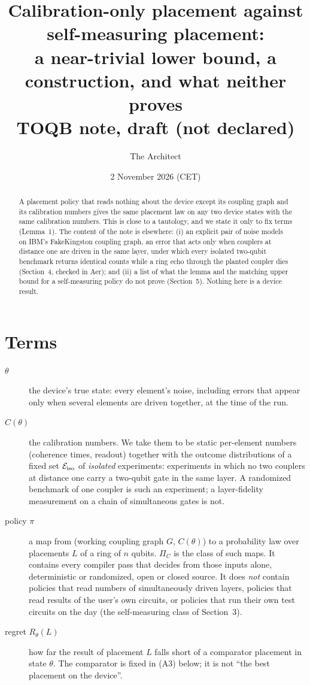 \documentclass[10pt,a4paper]{article}
\title{Calibration-only placement against self-measuring placement:\\ a near-trivial lower bound, a construction,
and what neither proves\\ \large TOQB note, draft (not declared)}
\author{The Architect}
\date{2 November 2026 (CET)}
\theoremstyle{definition}
\theoremstyle{remark}
\begin{document}
\maketitle

\begin{abstract}
A placement policy that reads nothing about the device except its coupling graph and its calibration numbers gives
the same placement law on any two device states with the same calibration numbers. This is close to a tautology, and
we state it only to fix terms (Lemma~1). The content of the note is elsewhere: (i) an explicit pair of noise models
on IBM's FakeKingston coupling graph, an error that acts only when couplers at distance one are driven in the same
layer, under which every isolated two-qubit benchmark returns identical counts while a ring echo through the planted
coupler dies (Section~4, checked in Aer); and (ii) a list of what the lemma and the matching upper bound for a
self-measuring policy do not prove (Section~5). Nothing here is a device result.
\end{abstract}

\section{Terms}

\begin{description}
\item[$\theta$] the device's true state: every element's noise, including errors that appear only when several
  elements are driven together, at the time of the run.
\item[$C(\theta)$] the calibration numbers. We take them to be static per-element numbers (coherence times, readout)
  together with the outcome distributions of a fixed set $\mathcal E_{\rm iso}$ of \emph{isolated} experiments:
  experiments in which no two couplers at distance one carry a two-qubit gate in the same layer. A randomized
  benchmark of one coupler is such an experiment; a layer-fidelity measurement on a chain of simultaneous gates is
  not.
\item[policy $\pi$] a map from (working coupling graph $G$, $C(\theta)$) to a probability law over placements $L$ of a
  ring of $n$ qubits. $\Pi_C$ is the class of such maps. It contains every compiler pass that decides from those inputs
  alone, deterministic or randomized, open or closed source. It does \emph{not} contain policies that read numbers of
  simultaneously driven layers, policies that read results of the user's own circuits, or policies that run their own
  test circuits on the day (the self-measuring class of Section~3).
\item[regret $R_\theta(L)$] how far the result of placement $L$ falls short of a comparator placement in state
  $\theta$. The comparator is fixed in (A3) below; it is not ``the best placement on the device''.
\end{description}
\end{document}
